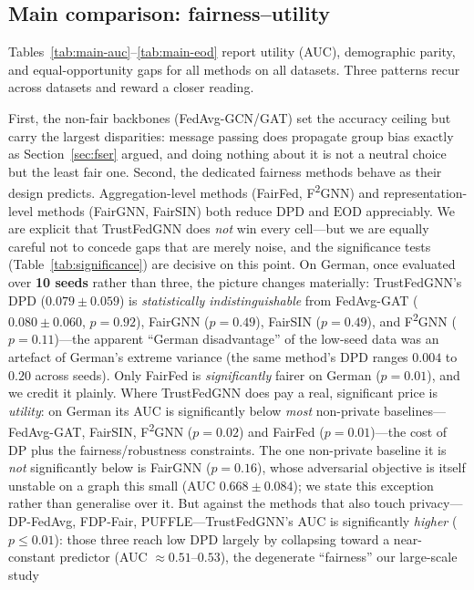 \documentclass[pdflatex,sn-mathphys-num]{sn-jnl}
\theoremstyle{thmstyleone}%
\theoremstyle{thmstyletwo}%
\theoremstyle{thmstylethree}%
\newcommand{\dpd}{\mathrm{DPD}}
\newcommand{\eod}{\mathrm{EOD}}
\begin{document}
\subsection{Main comparison: fairness--utility}
\label{sec:exp-main}
Tables~\ref{tab:main-auc}--\ref{tab:main-eod} report utility (AUC), demographic
parity, and equal-opportunity gaps for all methods on all datasets. Three
patterns recur across datasets and reward a closer reading.

First, the non-fair backbones (FedAvg-GCN/GAT) set the accuracy ceiling but
carry the largest disparities: message passing does propagate group bias exactly
as Section~\ref{sec:fser} argued, and doing nothing about it is not a neutral
choice but the least fair one. Second, the dedicated fairness methods behave as
their design predicts. Aggregation-level methods (FairFed, F\textsuperscript{2}GNN)
and representation-level methods (FairGNN, FairSIN) both reduce $\dpd$ and
$\eod$ appreciably. We are explicit that TrustFedGNN does \emph{not} win every
cell---but we are equally careful not to concede gaps that are merely noise, and
the significance tests (Table~\ref{tab:significance}) are decisive on this point.
On German, once evaluated over \textbf{10 seeds} rather than three, the picture
changes materially: TrustFedGNN's DPD ($0.079\!\pm\!0.059$) is
\emph{statistically indistinguishable} from FedAvg-GAT ($0.080\!\pm\!0.060$,
$p{=}0.92$), FairGNN ($p{=}0.49$), FairSIN ($p{=}0.49$), and F\textsuperscript{2}GNN
($p{=}0.11$)---the apparent ``German disadvantage'' of the low-seed data was an
artefact of German's extreme variance (the same method's DPD ranges $0.004$ to
$0.20$ across seeds). Only FairFed is \emph{significantly} fairer on German
($p{=}0.01$), and we credit it plainly. Where TrustFedGNN does pay a real,
significant price is \emph{utility}: on German its AUC is significantly below
\emph{most} non-private baselines---FedAvg-GAT, FairSIN, F\textsuperscript{2}GNN
($p{=}0.02$) and FairFed ($p{=}0.01$)---the cost of DP plus the
fairness/robustness constraints. The one non-private baseline it is \emph{not}
significantly below is FairGNN ($p{=}0.16$), whose adversarial objective is
itself unstable on a graph this small (AUC $0.668\!\pm\!0.084$); we state this
exception rather than generalise over it. But against the methods that also touch privacy---DP-FedAvg,
FDP-Fair, PUFFLE---TrustFedGNN's AUC is significantly \emph{higher} ($p{\le}0.01$):
those three reach low DPD largely by collapsing toward a near-constant predictor
(AUC $\approx 0.51$--$0.53$), the degenerate ``fairness'' our large-scale study
\end{document}
